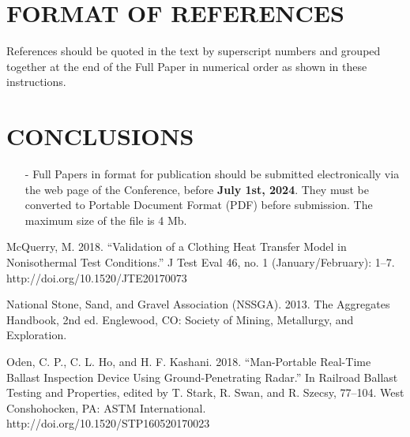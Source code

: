 \documentclass[a4paper]{eccomas_paper-2024}
\begin{document}
\section{FORMAT OF REFERENCES}

References should be quoted in the text by superscript
numbers \cite{McQuerry18,nssga,Oden18} and grouped together at the end of the Full Paper in numerical order as shown in these instructions.

\section{CONCLUSIONS}

\begin{itemize}
\item[-] Full Papers in format for publication should be submitted electronically via the web page of the Conference, before \textbf{July 1st, 2024}. They must be converted to  Portable Document Format (PDF) before submission. The maximum size of the file is 4 Mb.
\end{itemize}

\begin{thebibliography}{99}
  McQuerry, M. 2018. “Validation of a Clothing Heat Transfer Model in Nonisothermal Test Conditions.” J Test Eval 46, no. 1 (January/February): 1–7. http://doi.org/10.1520/JTE20170073

   National Stone, Sand, and Gravel Association (NSSGA). 2013. The Aggregates Handbook, 2nd ed. Englewood, CO: Society of Mining, Metallurgy, and Exploration.

  Oden, C. P., C. L. Ho, and H. F. Kashani. 2018. “Man-Portable Real-Time Ballast Inspection Device Using Ground-Penetrating Radar.” In Railroad Ballast Testing and Properties, edited by T. Stark, R. Swan, and R. Szecsy, 77–104. West Conshohocken, PA: ASTM International. http://doi.org/10.1520/STP160520170023

\end{thebibliography}
\end{document}
